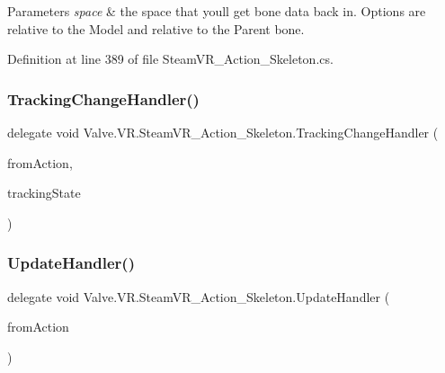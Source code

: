 \begin{DoxyParams}{Parameters}
{\em space} & the space that you\textquotesingle{}ll get bone data back in. Options are relative to the Model and relative to the Parent bone.\\
\hline
\end{DoxyParams}


Definition at line 389 of file Steam\+V\+R\+\_\+\+Action\+\_\+\+Skeleton.\+cs.

\mbox{\label{class_valve_1_1_v_r_1_1_steam_v_r___action___skeleton_a460bcda41aa359ec14435212bed2b856}} 
\subsubsection{\texorpdfstring{TrackingChangeHandler()}{TrackingChangeHandler()}}
{\footnotesize\ttfamily delegate void Valve.\+V\+R.\+Steam\+V\+R\+\_\+\+Action\+\_\+\+Skeleton.\+Tracking\+Change\+Handler (\begin{DoxyParamCaption}\item[{\mbox{\hyperlink{class_valve_1_1_v_r_1_1_steam_v_r___action___skeleton}{Steam\+V\+R\+\_\+\+Action\+\_\+\+Skeleton}}}]{from\+Action,  }\item[{\mbox{\hyperlink{namespace_valve_1_1_v_r_abe6feab98f33191b7c27b4292012e90a}{E\+Tracking\+Result}}}]{tracking\+State }\end{DoxyParamCaption})}

\mbox{\label{class_valve_1_1_v_r_1_1_steam_v_r___action___skeleton_a9fd666c2f3ccefc435275d85c525337c}} 
\subsubsection{\texorpdfstring{UpdateHandler()}{UpdateHandler()}}
{\footnotesize\ttfamily delegate void Valve.\+V\+R.\+Steam\+V\+R\+\_\+\+Action\+\_\+\+Skeleton.\+Update\+Handler (\begin{DoxyParamCaption}\item[{\mbox{\hyperlink{class_valve_1_1_v_r_1_1_steam_v_r___action___skeleton}{Steam\+V\+R\+\_\+\+Action\+\_\+\+Skeleton}}}]{from\+Action }\end{DoxyParamCaption})}

